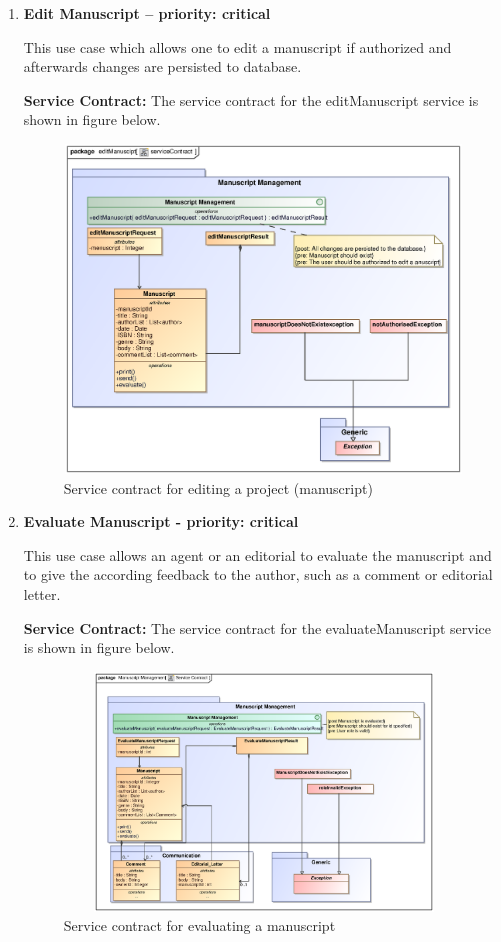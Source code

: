 \documentclass[12pt]{article}
\begin{document}
\begin{enumerate}
\newpage

\item \textbf{Edit Manuscript – priority: critical}
\par{This use case which allows one to edit a manuscript if authorized and afterwards changes are persisted to database.}

\par{\textbf{Service Contract:} The service contract for the editManuscript service is shown in figure below.}

\begin{figure}[h]
\includegraphics[height=330px, width=500px]{epsImages/ManuscriptManagement/editManuscript.eps}
\caption{Service contract for editing a  project (manuscript)}
\end{figure}
\newpage

\item \textbf{Evaluate Manuscript - priority: critical}
\par{This use case allows an agent or an editorial to evaluate the manuscript and to give the according feedback to the author, such as a comment or editorial letter.}

\par{\textbf{Service Contract:} The service contract for the evaluateManuscript service is shown in figure below.}

\begin{figure}[h]
\includegraphics[height=240px, width=500px]{epsImages/ManuscriptManagement/EvaluateManuscript.eps}
\caption{Service contract for evaluating a manuscript}
\end{figure}


\end{enumerate}
\end{document}
